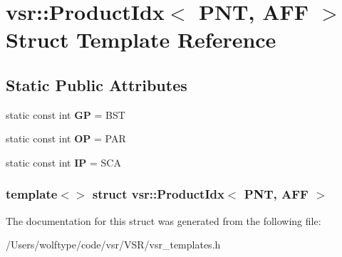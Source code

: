 \hypertarget{structvsr_1_1_product_idx_3_01_p_n_t_00_01_a_f_f_01_4}{\section{vsr\-:\-:Product\-Idx$<$ P\-N\-T, A\-F\-F $>$ Struct Template Reference}
\label{structvsr_1_1_product_idx_3_01_p_n_t_00_01_a_f_f_01_4}
}
\subsection*{Static Public Attributes}
\begin{DoxyCompactItemize}
\item 
\hypertarget{structvsr_1_1_product_idx_3_01_p_n_t_00_01_a_f_f_01_4_adf5020e0601d94bf5f18c190358b7279}{static const int {\bfseries G\-P} = B\-S\-T}\label{structvsr_1_1_product_idx_3_01_p_n_t_00_01_a_f_f_01_4_adf5020e0601d94bf5f18c190358b7279}

\item 
\hypertarget{structvsr_1_1_product_idx_3_01_p_n_t_00_01_a_f_f_01_4_aa3ffc97bbc9149c67868113e57d5f76c}{static const int {\bfseries O\-P} = P\-A\-R}\label{structvsr_1_1_product_idx_3_01_p_n_t_00_01_a_f_f_01_4_aa3ffc97bbc9149c67868113e57d5f76c}

\item 
\hypertarget{structvsr_1_1_product_idx_3_01_p_n_t_00_01_a_f_f_01_4_ae8f59d6c5aada291e66641e5c414ecad}{static const int {\bfseries I\-P} = S\-C\-A}\label{structvsr_1_1_product_idx_3_01_p_n_t_00_01_a_f_f_01_4_ae8f59d6c5aada291e66641e5c414ecad}

\end{DoxyCompactItemize}
\subsubsection*{template$<$$>$ struct vsr\-::\-Product\-Idx$<$ P\-N\-T, A\-F\-F $>$}



The documentation for this struct was generated from the following file\-:\begin{DoxyCompactItemize}
\item 
/\-Users/wolftype/code/vsr/\-V\-S\-R/vsr\-\_\-templates.\-h\end{DoxyCompactItemize}
